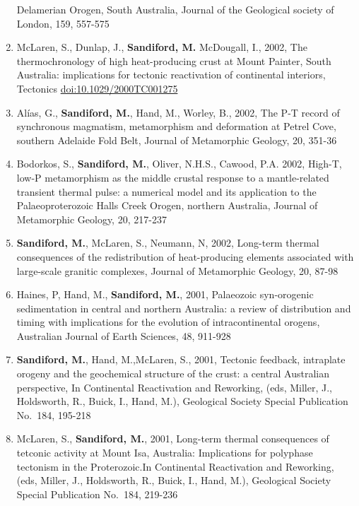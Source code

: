 \documentclass[
]{article}
\begin{document}
\begin{enumerate}
  Delamerian Orogen, South Australia, Journal of the Geological society
  of London, 159, 557-575 
\item
  McLaren, S., Dunlap, J., \textbf{Sandiford, M.} McDougall, I., 2002,
  The thermochronology of high heat-producing crust at Mount Painter,
  South Australia: implications for tectonic reactivation of continental
  interiors, Tectonics \url{doi:10.1029/2000TC001275}
\item
  Alías, G., \textbf{Sandiford, M.}, Hand, M., Worley, B., 2002, The P-T
  record of synchronous magmatism, metamorphism and deformation at
  Petrel Cove, southern Adelaide Fold Belt, Journal of Metamorphic
  Geology, 20, 351-36 
\item
  Bodorkos, S., \textbf{Sandiford, M.}, Oliver, N.H.S., Cawood, P.A.
  2002, High-T, low-P metamorphism as the middle crustal response to a
  mantle-related transient thermal pulse: a numerical model and its
  application to the Palaeoproterozoic Halls Creek Orogen, northern
  Australia, Journal of Metamorphic Geology, 20, 217-237
\item
  \textbf{Sandiford, M.}, McLaren, S., Neumann, N, 2002, Long-term
  thermal consequences of the redistribution of heat-producing elements
  associated with large-scale granitic complexes, Journal of Metamorphic
  Geology, 20, 87-98 
\item
  Haines, P, Hand, M., \textbf{Sandiford, M.}, 2001, Palaeozoic
  syn-orogenic sedimentation in central and northern Australia: a review
  of distribution and timing with implications for the evolution of
  intracontinental orogens, Australian Journal of Earth Sciences, 48,
  911-928 
\item
  \textbf{Sandiford, M.}, Hand, M.,McLaren, S., 2001, Tectonic feedback,
  intraplate orogeny and the geochemical structure of the crust: a
  central Australian perspective, In Continental Reactivation and
  Reworking, (eds, Miller, J., Holdsworth, R., Buick, I., Hand, M.),
  Geological Society Special Publication No.~184, 195-218
\item
  McLaren, S., \textbf{Sandiford, M.}, 2001, Long-term thermal
  consequences of tetconic activity at Mount Isa, Australia:
  Implications for polyphase tectonism in the Proterozoic.In Continental
  Reactivation and Reworking, (eds, Miller, J., Holdsworth, R., Buick,
  I., Hand, M.), Geological Society Special Publication No.~184, 219-236

\end{enumerate}
\end{document}
